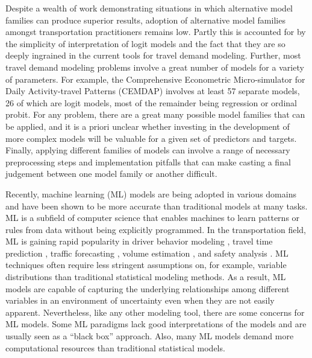 \documentclass[numbered]{trbunofficial}
\begin{document}
Despite a wealth of work demonstrating situations in which alternative model families can produce superior results, adoption of alternative model families amongst transportation practitioners remains low.
 Partly this is accounted for by the simplicity of interpretation of logit models and the fact that they are so deeply ingrained in the current tools for travel demand modeling.
 Further, most travel demand modeling problems involve a great number of models for a variety of parameters.
 For example, the Comprehensive Econometric Micro-simulator for Daily Activity-travel Patterns (CEMDAP)  involves at least 57 separate models, 26 of which are logit models, most of the remainder being regression or ordinal probit.
 For any problem, there are a great many possible model families that can be applied, and it is a priori unclear whether investing in the development of more complex models will be valuable for a given set of predictors and targets.
 Finally, applying different families of models can involve a range of necessary preprocessing steps and implementation pitfalls that can make casting a final judgement between one model family or another difficult.

Recently, machine learning (ML) models are being adopted in various domains and have been shown to be more accurate than traditional models at many tasks. 
 ML is a subfield of computer science that enables machines to learn patterns or rules from data without being explicitly programmed. 
 In the transportation field, ML is gaining rapid popularity in driver behavior modeling , travel time prediction , traffic forecasting , volume estimation , and safety analysis . 
 ML techniques often require less stringent assumptions on, for example, variable distributions than traditional statistical modeling methods.
 As a result, ML models are capable of capturing the underlying relationships among different variables in an environment of uncertainty even when they are not easily apparent. 
 Nevertheless, like any other modeling tool, there are some concerns for ML models. 
 Some ML paradigms lack good interpretations of the models and are usually seen as a ``black box'' approach. 
 Also, many ML models demand more computational resources than traditional statistical models.
 
\end{document}
